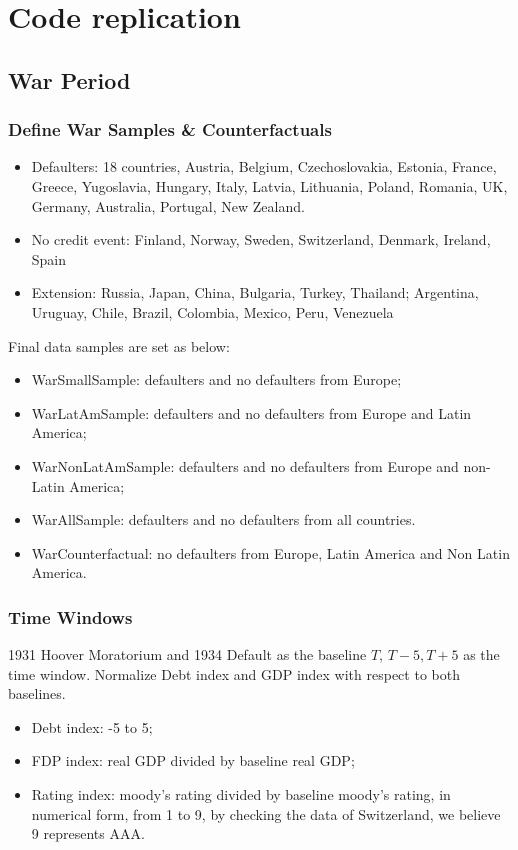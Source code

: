 \chapter{Code replication}
\label{chapter:codemodel}

\section{War Period}

\subsection{Define War Samples \& Counterfactuals}
\begin{itemize}
    \item Defaulters: 18 countries, Austria, Belgium, Czechoslovakia, Estonia, France, Greece, Yugoslavia, Hungary, Italy, Latvia, Lithuania, Poland, Romania, UK, Germany, Australia, Portugal, New Zealand.
    \item No credit event: Finland, Norway, Sweden, Switzerland, Denmark, Ireland, Spain
	\item Extension: Russia, Japan, China, Bulgaria, Turkey, Thailand; Argentina, Uruguay, Chile, Brazil, Colombia, Mexico, Peru, Venezuela
\end{itemize}

Final data samples are set as below:
\begin{itemize}
    \item WarSmallSample: defaulters and no defaulters from Europe;
    \item WarLatAmSample: defaulters and no defaulters from Europe and Latin America;
    \item WarNonLatAmSample: defaulters and no defaulters from Europe and non-Latin America;
    \item WarAllSample: defaulters and no defaulters from all countries.
    \item WarCounterfactual: no defaulters from Europe, Latin America and Non Latin America.
\end{itemize}


\subsection{Time Windows}
1931 Hoover Moratorium and 1934 Default as the baseline $T$, $T-5, T+5$ as the time window.
Normalize Debt index and GDP index with respect to both baselines.
\begin{itemize}
    \item Debt index: -5 to 5;
    \item FDP index: real GDP divided by baseline real GDP;
    \item Rating index: moody's rating divided by baseline moody's rating, in numerical form, from 1 to 9, by checking the data of Switzerland, we believe 9 represents AAA.
\end{itemize}

